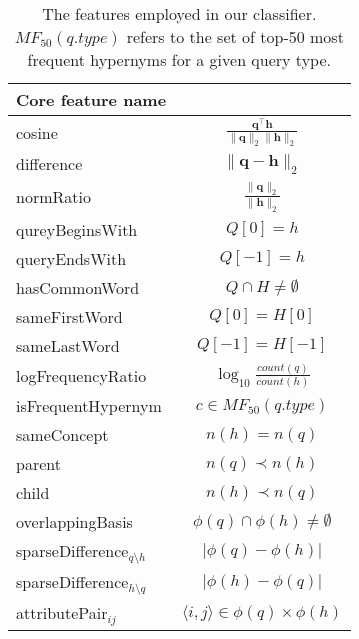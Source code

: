 \documentclass[11pt,a4paper]{article}
\begin{document}
\begin{table}
	\begin{tabular}{lc}
    \toprule
		Core feature name   & \\
    \midrule
		{cosine}            & $\frac{\mathbf{q}^\intercal \mathbf{h}}{\lVert \mathbf{q} \rVert_2\lVert \mathbf{h} \rVert_2}$ \\ %
		{difference}        & $\lVert \mathbf{q} - \mathbf{h} \rVert_2$ \\ %
		{normRatio}         & $\frac{\lVert \mathbf{q}\rVert_2}{\lVert 
		\mathbf{h} \rVert_2}$ \\ %
    \midrule
		{qureyBeginsWith}   & $Q[0] = h$ \\ %
		{queryEndsWith}     & $Q[-1] = h$ \\
		{hasCommonWord} & $Q \cap H \neq \emptyset$ \\ %
		{sameFirstWord}        & $Q[0] = H[0]$ \\ %
		{sameLastWord}        & $Q[-1] = H[-1]$ \\
		{logFrequencyRatio} & $\log_{10}\frac{count(q)}{count(h)}$ \\ %
	    {isFrequentHypernym}\footnote\footnotemark & $c \in MF_{50}(q.type)$\\
    \midrule
    sameConcept & $n(h)=n(q)$ \\
    parent  & $n(q)\prec n(h)$ \\
    child  & $n(h)\prec n(q)$ \\
    \midrule
{overlappingBasis}  & $\phi(q) \cap \phi(h) \neq \emptyset$ \\ %
{sparseDifference$_{q\setminus h}$} & $\lvert \phi(q) - \phi(h) \rvert$ \\ %
{sparseDifference$_{h\setminus q}$} & $\lvert \phi(h) - \phi(q) \rvert$ \\
attributePair$_{ij}$      & $\langle i,j\rangle\in\phi(q)\times\phi(h)$ \\ %
    \bottomrule
	\end{tabular}
  \caption{The features employed in our classifier. $MF_{50}(q.type)$ refers to 
  the set of top-50 most frequent hypernyms for a given query type.}
	\label{table:core_features}
\end{table}


\end{document}
